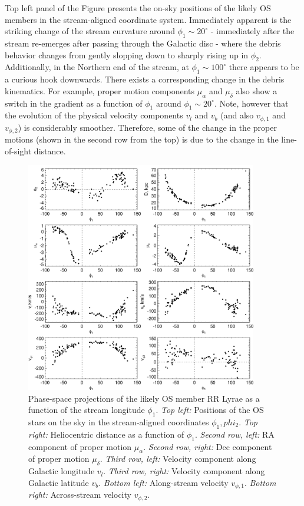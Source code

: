 \documentclass[a4paper,useAMS,usenatbib]{mnras}
\begin{document}
Top left panel of the Figure presents the on-sky positions of the
likely OS members in the stream-aligned coordinate system. Immediately
apparent is the striking change of the stream curvature around
$\phi_1\sim20^{\circ}$ - immediately after the stream re-emerges after
passing through the Galactic disc - where the debris behavior changes
from gently slopping down to sharply rising up in
$\phi_2$. Additionally, in the Northern end of the stream, at
$\phi_1\sim100^{\circ}$ there appears to be a curious hook
downwards. There exists a corresponding change in the debris
kinematics. For example, proper motion components $\mu_{\alpha}$ and
$\mu_{\delta}$ also show a switch in the gradient as a function of
$\phi_1$ around $\phi_1\sim20^{\circ}$. Note, however that the
evolution of the physical velocity components $v_l$ and $v_b$ (and
also $v_{\phi,1}$ and $v_{\phi,2}$) is considerably
smoother. Therefore, some of the change in the proper motions (shown
in the second row from the top) is due to the change in the
line-of-sight distance.

%
\begin{figure}
  \centering
  \includegraphics[width=0.9\textwidth]{orphan_paper_phi1_members.pdf}
  \caption[]{Phase-space projections of the likely OS member RR Lyrae
    as a function of the stream longitude $\phi_1$. {\it Top left:}
    Positions of the OS stars on the sky in the stream-aligned
    coordinates $\phi_1, phi_2$. {\it Top right:} Heliocentric
    distance as a function of $\phi_1$. {\it Second row, left:} RA
    component of proper motion $\mu_{\alpha}$. {\it Second row,
      right:} Dec component of proper motion $\mu_{\delta}$. {\it
      Third row, left:} Velocity component along Galactic longitude
    $v_l$. {\it Third row, right:} Velocity component along Galactic
    latitude $v_b$. {\it Bottom left:} Along-stream velocity
    $v_{\phi,1}$. {\it Bottom right:} Across-stream velocity
    $v_{\phi,2}$.}
   \label{fig:memother}
\end{figure}
%
\end{document}
